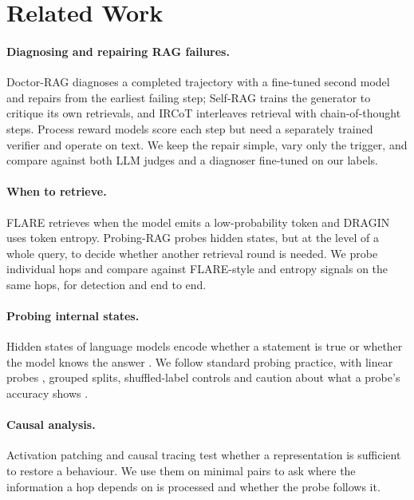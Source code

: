 \documentclass[11pt]{article}
\begin{document}
\section{Related Work}

\paragraph{Diagnosing and repairing RAG failures.} Doctor-RAG \citep{jiao2026doctor} diagnoses a completed trajectory with a fine-tuned second model and repairs from the earliest failing step; Self-RAG \citep{asai2024selfrag} trains the generator to critique its own retrievals, and IRCoT \citep{trivedi2023interleaving} interleaves retrieval with chain-of-thought steps. Process reward models \citep{lightman2024lets} score each step but need a separately trained verifier and operate on text. We keep the repair simple, vary only the trigger, and compare against both LLM judges and a diagnoser fine-tuned on our labels.

\paragraph{When to retrieve.} FLARE \citep{jiang2023active} retrieves when the model emits a low-probability token and DRAGIN \citep{su2024dragin} uses token entropy. Probing-RAG \citep{baek2025probing} probes hidden states, but at the level of a whole query, to decide whether another retrieval round is needed. We probe individual hops and compare against FLARE-style and entropy signals on the same hops, for detection and end to end.

\paragraph{Probing internal states.} Hidden states of language models encode whether a statement is true or whether the model knows the answer \citep{azaria2023internal,kadavath2022language,burns2023discovering}. We follow standard probing practice, with linear probes \citep{alain2017understanding}, grouped splits, shuffled-label controls \citep{hewitt2019designing} and caution about what a probe's accuracy shows \citep{belinkov2022probing}.

\paragraph{Causal analysis.} Activation patching and causal tracing \citep{meng2022locating,vig2020investigating,zhang2024towards} test whether a representation is sufficient to restore a behaviour. We use them on minimal pairs to ask where the information a hop depends on is processed and whether the probe follows it.
\end{document}
